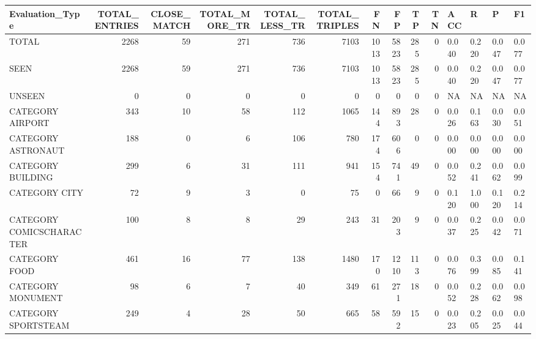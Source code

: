 \begin{tabular}{lrrrrrrrrrllll}
\hline
 Evaluation\_Type          &   TOTAL\_ENTRIES &   CLOSE\_MATCH &   TOTAL\_MORE\_TR &   TOTAL\_LESS\_TR &   TOTAL\_TRIPLES &   FN &   FP &   TP &   TN & ACC   & R     & P     & F1    \\
\hline
 TOTAL                    &            2268 &            59 &             271 &             736 &            7103 & 1013 & 5823 &  285 &    0 & 0.040 & 0.220 & 0.047 & 0.077 \\
 SEEN                     &            2268 &            59 &             271 &             736 &            7103 & 1013 & 5823 &  285 &    0 & 0.040 & 0.220 & 0.047 & 0.077 \\
 UNSEEN                   &               0 &             0 &               0 &               0 &               0 &    0 &    0 &    0 &    0 & NA    & NA    & NA    & NA    \\
 CATEGORY AIRPORT         &             343 &            10 &              58 &             112 &            1065 &  144 &  893 &   28 &    0 & 0.026 & 0.163 & 0.030 & 0.051 \\
 CATEGORY ASTRONAUT       &             188 &             0 &               6 &             106 &             780 &  174 &  606 &    0 &    0 & 0.000 & 0.000 & 0.000 & 0.000 \\
 CATEGORY BUILDING        &             299 &             6 &              31 &             111 &             941 &  154 &  741 &   49 &    0 & 0.052 & 0.241 & 0.062 & 0.099 \\
 CATEGORY CITY            &              72 &             9 &               3 &               0 &              75 &    0 &   66 &    9 &    0 & 0.120 & 1.000 & 0.120 & 0.214 \\
 CATEGORY COMICSCHARACTER &             100 &             8 &               8 &              29 &             243 &   31 &  203 &    9 &    0 & 0.037 & 0.225 & 0.042 & 0.071 \\
 CATEGORY FOOD            &             461 &            16 &              77 &             138 &            1480 &  170 & 1210 &  113 &    0 & 0.076 & 0.399 & 0.085 & 0.141 \\
 CATEGORY MONUMENT        &              98 &             6 &               7 &              40 &             349 &   61 &  271 &   18 &    0 & 0.052 & 0.228 & 0.062 & 0.098 \\
 CATEGORY SPORTSTEAM      &             249 &             4 &              28 &              50 &             665 &   58 &  592 &   15 &    0 & 0.023 & 0.205 & 0.025 & 0.044 \\

\end{tabular}
